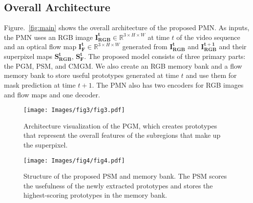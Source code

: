 \documentclass[10pt,twocolumn,letterpaper]{article}
\begin{document}
\subsection{Overall Architecture}
Figure.~\ref{fig:main} shows the overall architecture of the proposed PMN. As inputs, the PMN uses an RGB image $\mathbf{I^{t}_{RGB}} \in \mathbb{R} ^ {3 \times H \times W}$ at time $t$ of the video sequence and an optical flow map $\mathbf{I^{t}_{F}} \in \mathbb{R} ^ {3 \times H \times W}$ generated from $\mathbf{I^{t}_{RGB}}$ and $\mathbf{I^{t+1}_{RGB}}$ and their superpixel maps $\mathbf{S^{t}_{RGB}}$, $\mathbf{S^{t}_{F}}$. The proposed model consists of three primary parts: the PGM, PSM, and CMGM. We also create an RGB memory bank and a flow memory bank to store useful prototypes generated at time $t$ and use them for mask prediction at time $t+1$. The PMN also has two encoders for RGB images and flow maps and one decoder.

\begin{figure}[t]
	\setlength{\belowcaptionskip}{-24pt}
	\begin{center}
		\texttt{[image: Images/fig3/fig3.pdf]}
		\caption{Architecture visualization of the PGM, which creates prototypes that represent the overall features of the subregions that make up the superpixel.}
		\label{fig:PGM}
	\end{center}
\end{figure}

\begin{figure*}[t]
	\setlength{\belowcaptionskip}{-24pt}
	\begin{center}
		\texttt{[image: Images/fig4/fig4.pdf]}
		\caption{Structure of the proposed PSM and memory bank. The PSM scores the usefulness of the newly extracted prototypes and stores the highest-scoring prototypes in the memory bank.}
		\label{fig:PSM}
	\end{center}
\end{figure*}
\end{document}
